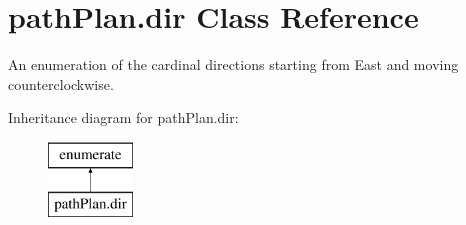 \hypertarget{classpath_plan_1_1dir}{}\section{path\+Plan.\+dir Class Reference}
\label{classpath_plan_1_1dir}


An enumeration of the cardinal directions starting from East and moving counterclockwise.  


Inheritance diagram for path\+Plan.\+dir\+:\begin{figure}[H]
\begin{center}
\leavevmode
\includegraphics[height=2.000000cm]{classpath_plan_1_1dir}
\end{center}
\end{figure}
